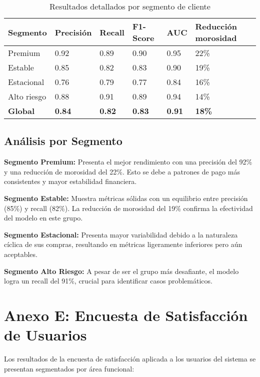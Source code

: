 \begin{table}[ht]
\centering
\begin{tabular}{|p{2.5cm}|p{2cm}|p{2cm}|p{2cm}|p{2cm}|p{2.5cm}|}
\hline
\textbf{Segmento} & \textbf{Precisión} & \textbf{Recall} & \textbf{F1-Score} & \textbf{AUC} & \textbf{Reducción morosidad} \\
\hline
Premium & 0.92 & 0.89 & 0.90 & 0.95 & 22\% \\
\hline
Estable & 0.85 & 0.82 & 0.83 & 0.90 & 19\% \\
\hline
Estacional & 0.76 & 0.79 & 0.77 & 0.84 & 16\% \\
\hline
Alto riesgo & 0.88 & 0.91 & 0.89 & 0.94 & 14\% \\
\hline
\textbf{Global} & \textbf{0.84} & \textbf{0.82} & \textbf{0.83} & \textbf{0.91} & \textbf{18\%} \\
\hline
\end{tabular}
\caption{Resultados detallados por segmento de cliente}
\label{tab:resultados_segmento}
\end{table}

\subsection{Análisis por Segmento}

\textbf{Segmento Premium:} Presenta el mejor rendimiento con una precisión del 92\% y una reducción de morosidad del 22\%. Esto se debe a patrones de pago más consistentes y mayor estabilidad financiera.

\textbf{Segmento Estable:} Muestra métricas sólidas con un equilibrio entre precisión (85\%) y recall (82\%). La reducción de morosidad del 19\% confirma la efectividad del modelo en este grupo.

\textbf{Segmento Estacional:} Presenta mayor variabilidad debido a la naturaleza cíclica de sus compras, resultando en métricas ligeramente inferiores pero aún aceptables.

\textbf{Segmento Alto Riesgo:} A pesar de ser el grupo más desafiante, el modelo logra un recall del 91\%, crucial para identificar casos problemáticos.
\section{Anexo E: Encuesta de Satisfacción de Usuarios}

Los resultados de la encuesta de satisfacción aplicada a los usuarios del sistema se presentan segmentados por área funcional:

